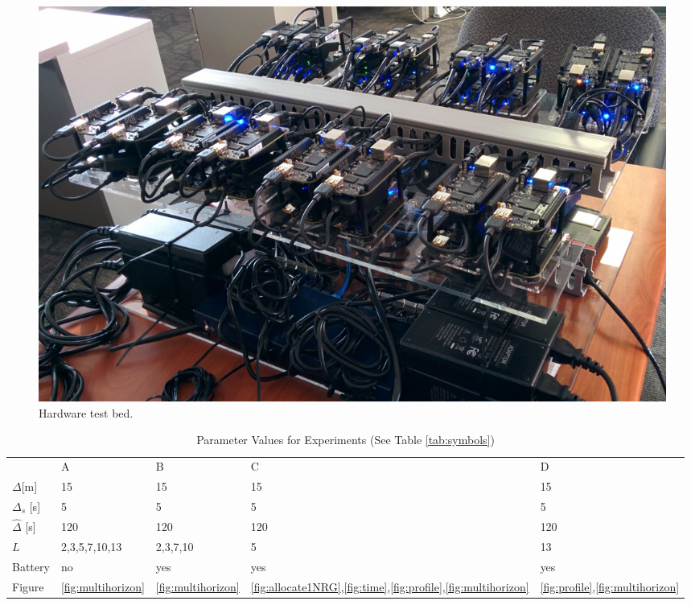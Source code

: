  
 \begin{figure}[ht]
	\centering		\includegraphics[width=1\columnwidth]{diagrams/testbed.jpg}
	\caption{Hardware test bed.}
   \label{fig:testbed_architecture}
\end{figure}


\begin{table}[ht]    
\caption{Parameter Values for Experiments (See Table \ref{tab:symbols})}
\label{table:test-parameters}  
\centering
\begin{tabular}{lllll}
& A  & B  & C  & D     \\ \cline{2-5} 
\multicolumn{1}{l|}{$\Delta$[m]}   & 15 & 15 & 15 & 15   \\
\multicolumn{1}{l|}{$\Delta_s$ [s]}   & 5 & 5 & 5 & 5   \\
\multicolumn{1}{l|}{$\hat{\Delta}$ [s]} & 120 & 120 & 120 & 120   \\
\multicolumn{1}{l|}{$L$}          & 2,3,5,7,10,13  & 2,3,7,10  & 5  & 13    \\
\multicolumn{1}{l|}{Battery}     & no & yes & yes & yes \\
\hline
\multicolumn{1}{l|}{Figure}     & \ref{fig:multihorizon} &\ref{fig:multihorizon} & \ref{fig:allocate1NRG},\ref{fig:time},\ref{fig:profile},\ref{fig:multihorizon} &  \ref{fig:profile},\ref{fig:multihorizon} 
\end{tabular}
\end{table}

